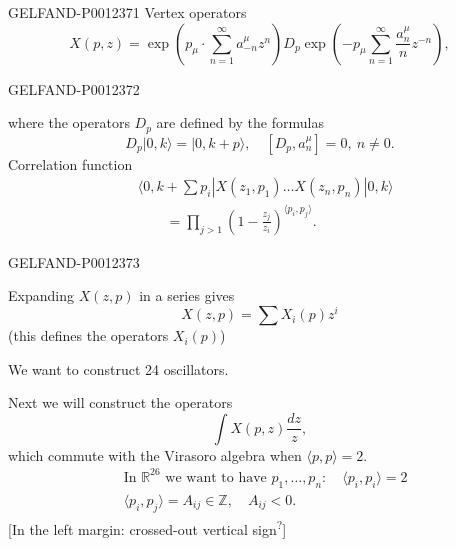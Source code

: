 \begin{GelfandAdjacentEvidence}{GELFAND-P001237}{1}
Vertex operators
\begin{equation*}
X(p,z)=\exp\left(p_\mu\cdot\sum_{n=1}^{\infty}a_{-n}^\mu z^n\right)D_p
\exp\left(-p_\mu\sum_{n=1}^{\infty}\frac{a_n^\mu}{n}z^{-n}\right),
\tag{6}
\end{equation*}
\end{GelfandAdjacentEvidence}
\begin{GelfandAdjacentEvidence}{GELFAND-P001237}{2}


where the operators $D_p$ are defined by the formulas
\begin{equation*}
D_p|0,k\rangle=|0,k+p\rangle,\quad [D_p,a_n^\mu]=0,\ n\ne0.
\tag{7}
\end{equation*}
Correlation function
\begin{equation*}
\begin{aligned}
&\langle0,k+\textstyle\sum p_i|X(z_1,p_1)\ldots X(z_n,p_n)|0,k\rangle\\
&\qquad=\prod_{j>1}\left(1-\frac{z_j}{z_i}\right)^{\langle p_i,p_j\rangle}.
\end{aligned}
\tag{8}
\end{equation*}
\end{GelfandAdjacentEvidence}
\begin{GelfandAdjacentEvidence}{GELFAND-P001237}{3}


Expanding $X(z,p)$ in a series gives
\begin{equation*}
X(z,p)=\sum X_i(p)z^i
\tag{9}
\end{equation*}
(this defines the operators $X_i(p)$)

We want to construct 24 oscillators.

Next we will construct the operators
\begin{equation*}
\int X(p,z)\frac{dz}{z},
\tag{10}
\end{equation*}
which commute with the Virasoro algebra when $\langle p,p\rangle=2$.
\begin{equation*}
\begin{aligned}
&\text{In }\mathbb R^{26}\text{ we want to have }p_1,\ldots,p_n:\quad\langle p_i,p_i\rangle=2\\
&\langle p_i,p_j\rangle=A_{ij}\in\mathbb Z,\quad A_{ij}<0.
\end{aligned}
\tag{11}
\end{equation*}
[In the left margin: crossed-out vertical sign\textsuperscript{?}]
\end{GelfandAdjacentEvidence}
